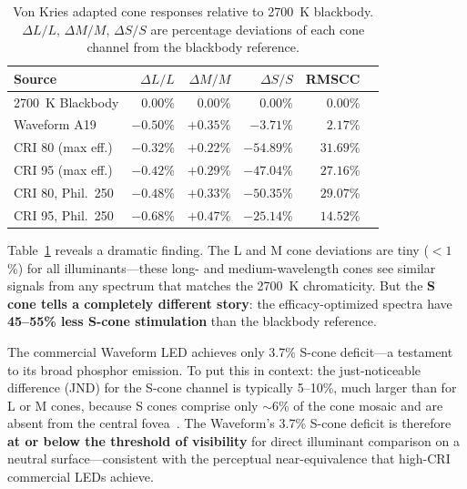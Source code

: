 \documentclass[11pt]{article}
\begin{document}
\begin{table}[h]
\centering
\small
\caption{Von Kries adapted cone responses relative to 2700~K blackbody.
$\Delta L/L$, $\Delta M/M$, $\Delta S/S$ are percentage deviations of
each cone channel from the blackbody reference.}
\label{tab:lms-contrast}
\begin{tabular}{lrrrrr}
\toprule
Source & $\Delta L/L$ & $\Delta M/M$ & $\Delta S/S$ & RMSCC \\
\midrule
2700~K Blackbody     & $0.00$\%   & $0.00$\%   & $0.00$\%    & $0.00$\% \\
Waveform A19         & $-0.50$\%  & $+0.35$\%  & $-3.71$\%   & $2.17$\% \\
CRI 80 (max eff.)    & $-0.32$\%  & $+0.22$\%  & $-54.89$\%  & $31.69$\% \\
CRI 95 (max eff.)    & $-0.42$\%  & $+0.29$\%  & $-47.04$\%  & $27.16$\% \\
CRI 80, Phil.\ 250   & $-0.48$\%  & $+0.33$\%  & $-50.35$\%  & $29.07$\% \\
CRI 95, Phil.\ 250   & $-0.68$\%  & $+0.47$\%  & $-25.14$\%  & $14.52$\% \\
\bottomrule
\end{tabular}
\end{table}

Table~\ref{tab:lms-contrast} reveals a dramatic finding.  The L and M
cone deviations are tiny ($<1$\%) for all illuminants---these long- and
medium-wavelength cones see similar signals from any spectrum that
matches the 2700~K chromaticity.  But the \textbf{S cone tells a
completely different story}: the efficacy-optimized spectra have
\textbf{45--55\% less S-cone stimulation} than the blackbody reference.

The commercial Waveform LED achieves only 3.7\% S-cone deficit---a
testament to its broad phosphor emission.  To put this in context: the
just-noticeable difference (JND) for the S-cone channel is typically
5--10\%, much larger than for L or M cones, because S cones comprise
only $\sim$6\% of the cone mosaic and are absent from the central
fovea~\cite{curcio1991}.  The Waveform's 3.7\% S-cone deficit is
therefore \textbf{at or below the threshold of visibility} for direct
illuminant comparison on a neutral surface---consistent with the
perceptual near-equivalence that high-CRI commercial LEDs achieve.
\end{document}
